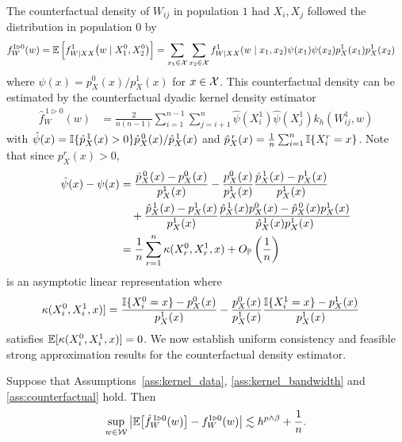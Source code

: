 The counterfactual density of
$W_{ij}$ in population $1$
had $X_i, X_j$
followed the distribution in population $0$ by
%
\begin{align*}
  f_W^{1 \triangleright 0}(w)
  &=
  \E\left[
    f_{W \mid XX}^1\big(w \mid X_1^0, X_2^0\big)
  \right]
  = \sum_{x_1 \in \cX}
  \sum_{x_2 \in \cX}
  f_{W \mid XX}^{1}(w \mid x_1, x_2)
  \psi(x_1)
  \psi(x_2)
  p_X^{1}(x_1)
  p_X^{1}(x_2)
\end{align*}
%
where $\psi(x) = p_X^0(x)/p_X^1(x)$ for $x \in \cX$.
This counterfactual density can be estimated by
the counterfactual dyadic kernel density estimator
%
\begin{align*}
  \hat f_W^{\,1 \triangleright 0}(w)
  &=
  \frac{2}{n(n-1)}
  \sum_{i=1}^{n-1}
  \sum_{j=i+1}^n
  \hat \psi(X_i^1)
  \hat \psi(X_j^1)
  k_h(W_{ij}^1, w)
\end{align*}
%
with
$\hat\psi(x) =
\I\{\hat p_X^{\,1}(x) > 0\}\hat p_X^{\,0}(x) / \hat p_X^{\,1}(x)$
and $\hat p_X^{\,r}(x) = \frac{1}{n}\sum_{i = 1}^n \I\{X_i^r = x\}$.
Note that since $p_X^r(x) > 0$,
%
\begin{align*}
  \hat\psi(x) - \psi(x)
  &=
  \frac{\hat p_X^{\,0}(x) - p_X^0(x)}{p_X^1(x)}
  - \frac{p_X^0(x)}{p_X^1(x)}
  \frac{\hat p_X^{\,1}(x) - p_X^1(x)}{p_X^1(x)} \\
  &\quad+
  \frac{\hat p_X^{\,1}(x) - p_X^1(x)}{p_X^1(x)}
  \frac{\hat p_X^{\,1}(x) p_X^0(x) - \hat p_X^{\,0}(x)p_X^1(x)}
  {\hat p_X^{\,1}(x) p_X^1(x)} \\
  &=
  \frac{1}{n}
  \sum_{r=1}^n \kappa(X_r^0, X_r^1, x)
  + O_\P\left(\frac{1}{n}\right)
\end{align*}
%
is an asymptotic linear representation where
%
\begin{align*}
  \kappa(X_i^0, X_i^1, x)]
  &=
  \frac{\I\{X_i^0 = x\} - p_X^0(x)}{p_X^1(x)}
  - \frac{p_X^0(x)}{p_X^1(x)}
  \frac{\I\{X_i^1 = x\} - p_X^1(x)}{p_X^1(x)}
\end{align*}
%
satisfies
$\E[\kappa(X_i^0, X_i^1, x)] = 0$.
We now establish uniform consistency and feasible strong
approximation results for the counterfactual density estimator.

\begin{lemma}
  \label{lem:counterfactual_bias}

  Suppose that Assumptions~\ref{ass:kernel_data},
  \ref{ass:kernel_bandwidth} and \ref{ass:counterfactual} hold.
  Then
  \begin{align*}
    \sup_{w \in \cW}
    \big|
    \E\big[\hat f_W^{\,1 \triangleright 0}(w)\big]
    - f_W^{1 \triangleright 0}(w)
    \big|
    \lesssim
    h^{p \wedge \beta} + \frac{1}{n}.
  \end{align*}

\end{lemma}

